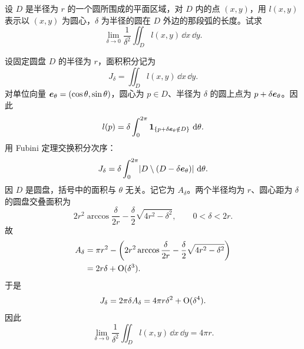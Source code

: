 \begin{xreferenceproblem}[4]
设 $D$ 是半径为 $r$ 的一个圆所围成的平面区域，对 $D$ 内的点 $(x,y)$，用 $l(x,y)$ 表示以 $(x,y)$ 为圆心，$\delta$ 为半径的圆在 $D$ 外边的那段弧的长度。试求
\[
  \lim_{\delta\to0}\frac1{\delta^2}\iint_Dl(x,y)\,\dd x\,\dd y.
\]
\end{xreferenceproblem}
\begin{xsolution}
设固定圆盘 $D$ 的半径为 $r$，面积积分记为
\[
  J_\delta=\iint_D l(x,y)\,\dd x\,\dd y.
\]
对单位向量 $\bm{e}_\theta=(\cos\theta,\sin\theta)$，圆心为 $p\in D$、半径为 $\delta$ 的圆上点为 $p+\delta\bm{e}_\theta$。因此
\[
  l(p)=\delta\int_0^{2\pi}
  \mathbf1_{\{p+\delta\bm{e}_\theta\notin D\}}\,\mathop{}\!\mathrm{d}\theta.
\]
用 Fubini 定理交换积分次序：
\[
  J_\delta
  =\delta\int_0^{2\pi}
  \lvert D\setminus(D-\delta\bm{e}_\theta)\rvert\,\mathop{}\!\mathrm{d}\theta.
\]
因 $D$ 是圆盘，括号中的面积与 $\theta$ 无关。记它为 $A_\delta$。两个半径均为 $r$、圆心距为 $\delta$ 的圆盘交叠面积为
\[
  2r^2\arccos\frac{\delta}{2r}
  -\frac\delta2\sqrt{4r^2-\delta^2},
  \qquad0<\delta<2r.
\]
故
\begin{align*}
  A_\delta
  &=\pi r^2-\left(
  2r^2\arccos\frac{\delta}{2r}
  -\frac\delta2\sqrt{4r^2-\delta^2}
  \right)\\
  &=2r\delta+\mathrm{O}(\delta^3).
\end{align*}
于是
\[
  J_\delta=2\pi\delta A_\delta
  =4\pi r\delta^2+\mathrm{O}(\delta^4).
\]
因此
\[
  \boxed{
  \lim_{\delta\to0}\frac1{\delta^2}\iint_Dl(x,y)\,\dd x\,\dd y
  =4\pi r}.
\]
\end{xsolution}
